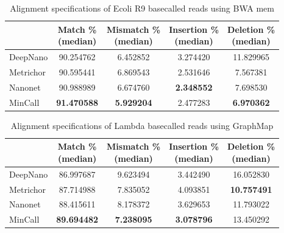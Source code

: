 \documentclass[runningheads,a4paper]{llncs}
\begin{document}
\begin{table}[]
	\caption{Alignment specifications of Ecoli R9 basecalled reads using BWA mem}
	\label{tbl:ecoli_rates_bwa}
	\centering
	\begin{tabular}{lcccc}
		\toprule
		{} &  \thead{Match \% \\(median)} &  \thead{Mismatch \% \\(median)} &  \thead{Insertion \% \\(median)} &  \thead{Deletion \% \\(median)} \\
		\midrule
		DeepNano   &                  90.254762 &                      6.452852 &                       3.274420 &                     11.829965 \\
		Metrichor  &                  90.595441 &                      6.869543 &                       2.531646 &                      7.567381 \\
		Nanonet    &                  90.988989 &                      6.674760 &                     \textbf{  2.348552} &                      7.698530 \\
		MinCall    &                 \textbf{ 91.470588} &                      \textbf{5.929204 }&                       2.477283 &                     \textbf{ 6.970362} \\
		\bottomrule
	\end{tabular}

\end{table}
\begin{table}[]
	\caption{Alignment specifications of Lambda basecalled reads using GraphMap}
	\label{tbl:lambda_rates}
	\centering
	\begin{tabular}{lcccc}
		\toprule
		{} &  \thead{Match \% \\(median)} &  \thead{Mismatch \% \\(median)} &  \thead{Insertion \% \\(median)} &  \thead{Deletion \% \\(median)} \\
		\midrule
		DeepNano   &                  86.997687 &                      9.623494 &                       3.442490 &                     16.052830 \\
		Metrichor  &                  87.714988 &                      7.835052 &                       4.093851 &                     \textbf{10.757491} \\
		Nanonet    &                  88.415611 &                      8.178372 &                       3.629653 &                     11.793022 \\
		MinCall    &                 \textbf{ 89.694482} &                     \textbf{ 7.238095} &                       \textbf{3.078796} &                     13.450292 \\
		\bottomrule
	\end{tabular}

\end{table}
\end{document}
